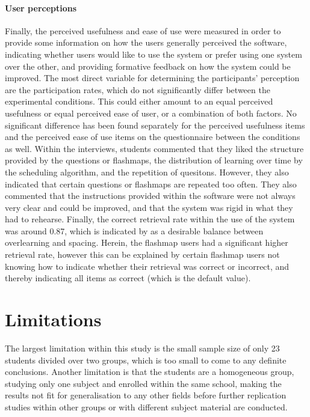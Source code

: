 \paragraph{User perceptions} Finally, the perceived usefulness and ease of use were measured in order to provide some information on how the users generally perceived the software, indicating whether users would like to use the system or prefer using one system over the other, and providing formative feedback on how the system could be improved. The most direct variable for determining the participants' perception are the participation rates, which do not significantly differ between the experimental conditions. This could either amount to an equal perceived usefulness or equal perceived ease of user, or a combination of both factors. No significant difference has been found separately for the perceived usefulness items and the perceived ease of use items on the questionnaire between the conditions as well. Within the interviews, students commented that they liked the structure provided by the questions or flashmaps, the distribution of learning over time by the scheduling algorithm, and the repetition of quesitons. However, they also indicated that certain questions or flashmaps are repeated too often. They also commented that the instructions provided within the software were not always very clear and could be improved, and that the system was rigid in what they had to rehearse. Finally, the correct retrieval rate within the use of the system was around 0.87, which is indicated by  as a desirable balance between overlearning and spacing. Herein, the flashmap users had a significant higher retrieval rate, however this can be explained by certain flashmap users not knowing how to indicate whether their retrieval was correct or incorrect, and thereby indicating all items as correct (which is the default value). 

\section{Limitations}

The largest limitation within this study is the small sample size of only 23 students divided over two groups, which is too small to come to any definite conclusions. Another limitation is that the students are a homogeneous group, studying only one subject and enrolled within the same school, making the results not fit for generalisation to any other fields before further replication studies within other groups or with different subject material are conducted.

